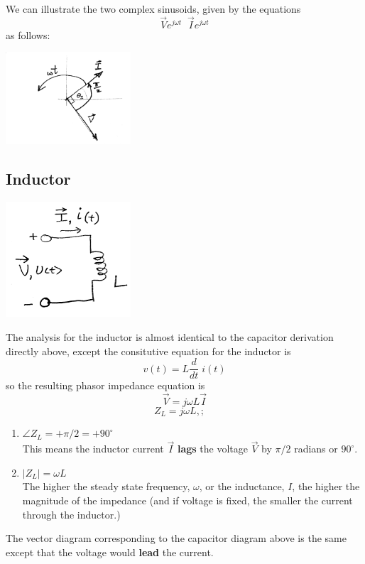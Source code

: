 We can illustrate the two complex sinusoids, given by the equations
\[
\vec{V}e^{j\omega t}\;\; \vec{I}e^{j\omega t}
\]
as follows:

\includegraphics[width=0.35\textwidth]{figsChapt02/GM66229.png}



\subsection{Inductor}
\includegraphics[width=0.35\textwidth]{figsChapt02/MP46579.png}

The analysis for the inductor is almost identical to the capacitor derivation directly above, except the consitutive equation
for the inductor is
\[
v(t) = L\frac {d}  {dt} \; i(t)
\]
so the resulting phasor impedance  equation is
\[
\vec{V} = j\omega L \vec{I}
\]
\[
Z_L = j\omega L,;\quad
\]

\begin{enumerate}
  \item $\angle{Z_L} = +\pi/2 = +90^\circ$\\
  This means the inductor current $\vec{I}$ {\bf lags} the voltage $\vec{V}$ by $\pi/2$ radians or $90^\circ$.
  \item $|Z_L| = \omega L$\\
  The higher the steady state frequency, $\omega$, or the inductance, $I$, the higher the magnitude of the impedance (and if voltage is fixed,
  the smaller the current through the inductor.)
\end{enumerate}

The vector diagram corresponding to the capacitor diagram above is the same except that the voltage would {\bf lead} the current.


